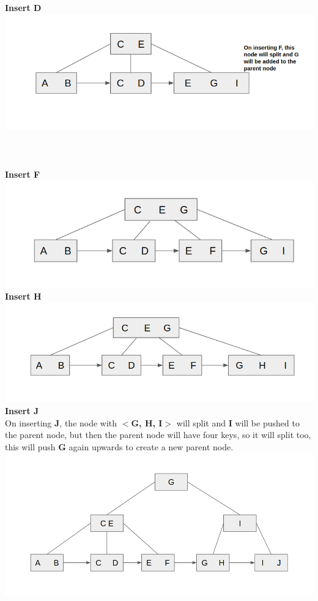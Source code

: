 \documentclass[12pt]{article}
\begin{document}
\begin{enumerate}
\begin{enumerate}
\textbf{Insert D}\\
\includegraphics[scale=0.5]{q37.png}\\\\\\\\
\textbf{Insert F}\\
\includegraphics[scale=0.55]{q38.png}\\
\textbf{Insert H}\\
\includegraphics[scale=0.55]{q39.png}\\
\textbf{Insert J}\\
On inserting \textbf{J}, the node with \textbf{$<$G, H, I$>$} will split and \textbf{I} will be pushed to the parent node, but then the parent node will have four keys, so it will split too, this will push \textbf{G} again upwards to create a new parent node. \\
\includegraphics[scale=0.49]{q310.png}\\\\

\end{enumerate}
\end{enumerate}
\end{document}
